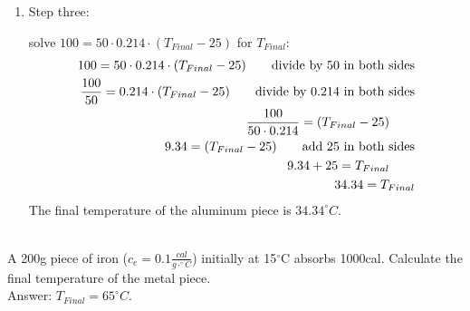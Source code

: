 \documentclass[main.tex]{subfiles}
\begin{document}
\begin{description}
\begin{example}
\begin{enumerate}[label=\protect\circled{\color{white}\arabic*}]
\vspace{12mm} %
\item \begin{bf}Step three:\end{bf} solve $100=50\cdot 0.214\cdot  (T_{Final}-25)$ for $T_{Final}$:
\begin{align}
  100=50\cdot 0.214\cdot  (T_{Final}-25)                   \tag*{divide by 50 in both sides}
    \\ \frac{100}{50}=0.214\cdot  (T_{Final}-25)   \tag*{divide by 0.214 in both sides}    
        \\ \frac{100}{50\cdot 0.214}= (T_{Final}-25)   \tag*{}             
                 \\ 9.34= (T_{Final}-25)   \tag*{add 25 in both sides}             
                 \\ 9.34+25= T_{Final}   \tag*{}             
                 \\ 34.34= T_{Final}   \notag            
\end{align}
The final temperature of the aluminum piece is $34.34^{\circ}C$.
\end{enumerate}
\faDiamond\ \\
A 200g piece of iron ($c_e=0.1\frac{cal}{g\cdot^{\circ}C}$) initially at 15$^{\circ}$C absorbs 1000cal. Calculate the final temperature of the metal piece.\\
\flushright Answer: $T_{Final}=65^{\circ}C$.
\end{example}%
\end{description}
\end{document}
